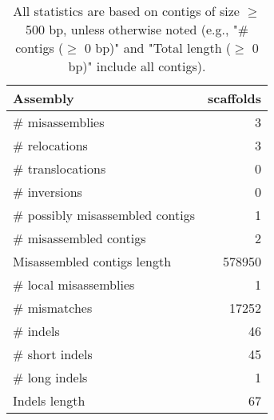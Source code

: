 \documentclass[12pt,a4paper]{article}
\begin{document}
\begin{table}[ht]
\begin{center}
\caption{All statistics are based on contigs of size $\geq$ 500 bp, unless otherwise noted (e.g., "\# contigs ($\geq$ 0 bp)" and "Total length ($\geq$ 0 bp)" include all contigs).}
\begin{tabular}{|l*{1}{|r}|}
\hline
Assembly & scaffolds \\ \hline
\# misassemblies & 3 \\ \hline
\hspace{5mm}\# relocations & 3 \\ \hline
\hspace{5mm}\# translocations & 0 \\ \hline
\hspace{5mm}\# inversions & 0 \\ \hline
\# possibly misassembled contigs & 1 \\ \hline
\# misassembled contigs & 2 \\ \hline
Misassembled contigs length & 578950 \\ \hline
\# local misassemblies & 1 \\ \hline
\# mismatches & 17252 \\ \hline
\# indels & 46 \\ \hline
\hspace{5mm}\# short indels & 45 \\ \hline
\hspace{5mm}\# long indels & 1 \\ \hline
Indels length & 67 \\ \hline
\end{tabular}
\end{center}
\end{table}
\end{document}
